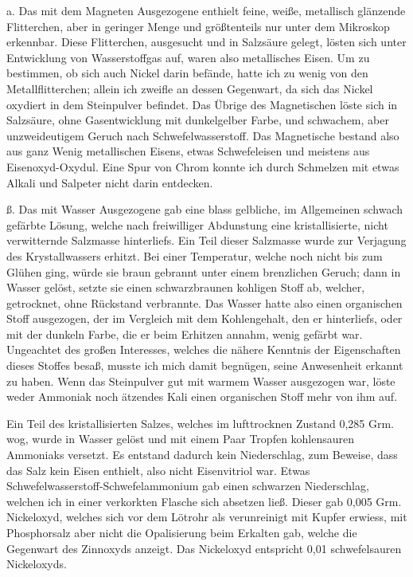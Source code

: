 \documentclass[a4paper, 11pt, oneside]{article}
\begin{document}
a. Das mit dem Magneten Ausgezogene enthielt feine, weiße, metallisch glänzende Flitterchen, aber in geringer Menge und größtenteils nur unter dem Mikroskop erkennbar. Diese Flitterchen, ausgesucht und in Salzsäure gelegt, lösten sich unter Entwicklung von Wasserstoffgas auf, waren also metallisches Eisen. Um zu bestimmen, ob sich auch Nickel darin befände, hatte ich zu wenig von den Metallflitterchen; allein ich zweifle an dessen Gegenwart, da sich das Nickel oxydiert in dem Steinpulver befindet. Das Übrige des Magnetischen löste sich in Salzsäure, ohne Gasentwicklung mit dunkelgelber Farbe, und schwachem, aber unzweideutigem Geruch nach Schwefelwasserstoff. Das Magnetische bestand also aus ganz Wenig metallischen Eisens, etwas Schwefeleisen und meistens aus Eisenoxyd-Oxydul. Eine Spur von Chrom konnte ich durch Schmelzen mit etwas Alkali und Salpeter nicht darin entdecken.

ß. Das mit Wasser Ausgezogene gab eine blass gelbliche, im Allgemeinen schwach gefärbte Lösung, welche nach freiwilliger Abdunstung eine kristallisierte, nicht verwitternde Salzmasse hinterliefs. Ein Teil dieser Salzmasse wurde zur Verjagung des Krystallwassers erhitzt. Bei einer Temperatur, welche noch nicht bis zum Glühen ging, würde sie braun gebrannt unter einem brenzlichen Geruch; dann in Wasser gelöst, setzte sie einen schwarzbraunen kohligen Stoff ab, welcher, getrocknet, ohne Rückstand verbrannte. Das Wasser hatte also einen organischen Stoff ausgezogen, der im Vergleich mit dem Kohlengehalt, den er hinterliefs, oder mit der dunkeln Farbe, die er beim Erhitzen annahm, wenig gefärbt war. Ungeachtet des großen Interesses, welches die nähere Kenntnis der Eigenschaften dieses Stoffes besaß, musste ich mich damit begnügen, seine Anwesenheit erkannt zu haben. Wenn das Steinpulver gut mit warmem Wasser ausgezogen war, löste weder Ammoniak noch ätzendes Kali einen organischen Stoff mehr von ihm auf.

Ein Teil des kristallisierten Salzes, welches im lufttrocknen Zustand 0,285 Grm. wog, wurde in Wasser gelöst und mit einem Paar Tropfen kohlensauren Ammoniaks versetzt. Es entstand dadurch kein Niederschlag, zum Beweise, dass das Salz kein Eisen enthielt, also nicht Eisenvitriol war. Etwas Schwefelwasserstoff-Schwefelammonium gab einen schwarzen Niederschlag, welchen ich in einer verkorkten Flasche sich absetzen ließ. Dieser gab 0,005 Grm. Nickeloxyd, welches sich vor dem Lötrohr als verunreinigt mit Kupfer erwiess, mit Phosphorsalz aber nicht die Opalisierung beim Erkalten gab, welche die Gegenwart des Zinnoxyds anzeigt. Das Nickeloxyd entspricht 0,01 schwefelsauren Nickeloxyds.
\end{document}
